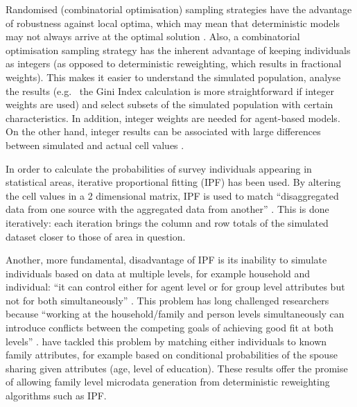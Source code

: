 \documentclass[a4paper, 11pt, twoside]{Thesis}
\begin{document}
Randomised (combinatorial optimisation) sampling strategies have the advantage
of robustness against local
optima, which may mean that deterministic models may not always arrive at the
optimal solution \citep{Williamson1998}.
Also, a combinatorial optimisation sampling strategy has the inherent advantage of
keeping individuals as integers (as opposed to deterministic reweighting,
which results in fractional weights). This makes it easier to
understand the simulated population, analyse the results 
(e.g.~ the Gini Index calculation
is more straightforward if integer weights are used) and select
subsets of the simulated population with certain characteristics.
In addition, integer weights are needed for agent-based models. On the other
hand, integer results can be associated with large differences between simulated
and actual cell values \citep{Ballas2005}⁠.

In order to calculate the probabilities of survey individuals appearing in
statistical areas, iterative proportional fitting (IPF) has been used. By
altering the cell values in a 2 dimensional matrix, IPF is used to match
``disaggregated data from one source with the aggregated data from another''
\citep[p.~1]{Norman1999a}⁠. This is done iteratively: each iteration brings the column and
row totals of the simulated dataset closer to those of area in question.

Another, more fundamental, disadvantage of IPF is its inability to simulate
individuals based on data at multiple levels, for example household and
individual: ``it can control either for agent level or for group level
attributes but not for both simultaneously'' \citep[p.~5]{Muller2010}.
This problem has long challenged researchers because ``working at the
household/family and person levels simultaneously can introduce conflicts
between the competing goals of achieving good fit at both levels''
\citet[p.~694]{Pritchard2012}. \citet{Pritchard2012} have tackled this problem
by matching either individuals to known family attributes, for example 
based on conditional probabilities of the spouse sharing given
attributes (age, level of education). These results offer the promise of allowing
family level microdata generation from deterministic reweighting algorithms
such as IPF.
\end{document}
